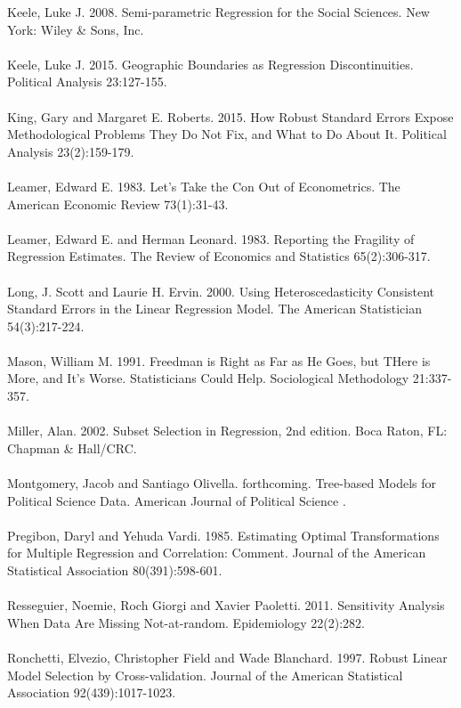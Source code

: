 \documentclass[letterpaper]{article}
\begin{document}
Keele, Luke J. 2008. Semi-parametric Regression for the Social Sciences. New York: Wiley \& Sons, Inc.
\\
\\
Keele, Luke J. 2015. Geographic Boundaries as Regression Discontinuities. Political Analysis 23:127-155.
\\
\\
King, Gary and Margaret E. Roberts. 2015. How Robust Standard Errors Expose Methodological Problems They Do Not Fix, and What to Do About It. Political Analysis 23(2):159-179.
\\
\\
Leamer, Edward E. 1983. Let's Take the Con Out of Econometrics. The American Economic Review 73(1):31-43.
\\
\\
Leamer, Edward E. and Herman Leonard. 1983. Reporting the Fragility of Regression Estimates. The Review of Economics and Statistics 65(2):306-317.
\\
\\
Long, J. Scott and Laurie H. Ervin. 2000. Using Heteroscedasticity Consistent Standard Errors in the Linear Regression Model. The American Statistician 54(3):217-224.
\\
\\
Mason, William M. 1991. Freedman is Right as Far as He Goes, but THere is More, and It's Worse. Statisticians Could Help. Sociological Methodology 21:337-357.
\\
\\
Miller, Alan. 2002. Subset Selection in Regression, 2nd edition. Boca Raton, FL: Chapman \& Hall/CRC.
\\
\\
Montgomery, Jacob and Santiago Olivella. forthcoming. Tree-based Models for Political Science Data. American Journal of Political Science .
\\
\\
Pregibon, Daryl and Yehuda Vardi. 1985. Estimating Optimal Transformations for Multiple Regression and Correlation: Comment. Journal of the American Statistical Association 80(391):598-601.
\\
\\
Resseguier, Noemie, Roch Giorgi and Xavier Paoletti. 2011. Sensitivity Analysis When Data Are Missing Not-at-random. Epidemiology 22(2):282.
\\
\\
Ronchetti, Elvezio, Christopher Field and Wade Blanchard. 1997. Robust Linear Model Selection by Cross-validation. Journal of the American Statistical Association 92(439):1017-1023.
\\
\\

%
%
\end{document}

